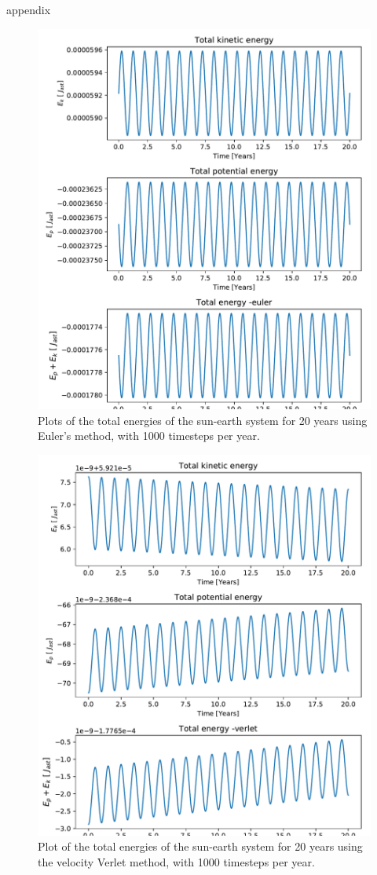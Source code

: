 appendix


\begin{figure}[H]
\includegraphics[width=0.9\linewidth]{../results/plots/totalenergy_all-euler.pdf}\caption{Plots of the total energies of the sun-earth system for 20 years using Euler's method, with 1000 timesteps per year.}\label{fig:totalenergy_all-euler}
\end{figure}	

\begin{figure}[H]
\includegraphics[width=0.9\linewidth]{../results/plots/totalenergy_all-verlet.pdf}\caption{Plot of the total energies of the sun-earth system for 20 years using the velocity Verlet method, with 1000 timesteps per year.}\label{fig:totalenergy_all-verlet}
\end{figure}
